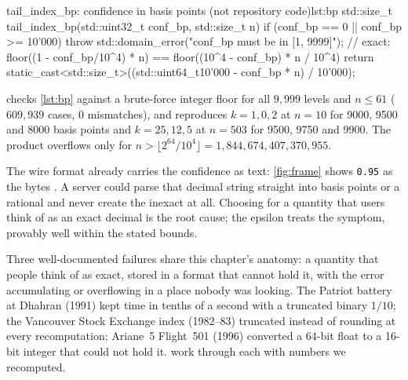 \begin{code}{tail\_index\_bp: confidence in basis points (not repository code)}{lst:bp}
std::size_t tail_index_bp(std::uint32_t conf_bp, std::size_t n) {
    if (conf_bp == 0 || conf_bp >= 10'000) throw std::domain_error("conf_bp must be in [1, 9999]");
    // exact: floor((1 - conf_bp/10^4) * n) == floor((10^4 - conf_bp) * n / 10^4)
    return static_cast<std::size_t>((std::uint64_t{10'000 - conf_bp} * n) / 10'000);
}
\end{code}

\begin{verified}
 checks \cref{lst:bp} against a brute-force integer floor for all $9{,}999$ levels and $n\le61$
($609{,}939$ cases, 0 mismatches), and reproduces $k=1,0,2$ at $n=10$ for 9000, 9500 and 8000 basis points and
$k=25,12,5$ at $n=503$ for 9500, 9750 and 9900. The product overflows  only for
$n>\lfloor2^{64}/10^4\rfloor=1{,}844{,}674{,}407{,}370{,}955$.
\end{verified}

\begin{remarkbox}
The wire format already carries the confidence as text: \cref{fig:frame} shows \texttt{0.95} as the bytes
. A server could parse that decimal string straight into basis points or a rational and never create the
inexact  at all. Choosing  for a quantity that users think of as an exact decimal is the root cause;
the epsilon treats the symptom, provably well within the stated bounds.
\end{remarkbox}

\begin{history}
Three well-documented failures share this chapter's anatomy: a quantity that people think of as exact, stored in a
format that cannot hold it, with the error accumulating or overflowing in a place nobody was looking. The Patriot
battery at Dhahran (1991) kept time in tenths of a second with a truncated binary $1/10$; the Vancouver Stock Exchange index
(1982--83) truncated instead of rounding at every recomputation; Ariane~5 Flight~501 (1996) converted a 64-bit float to a
16-bit integer that could not hold it.  work through each with numbers we recomputed.
\end{history}

